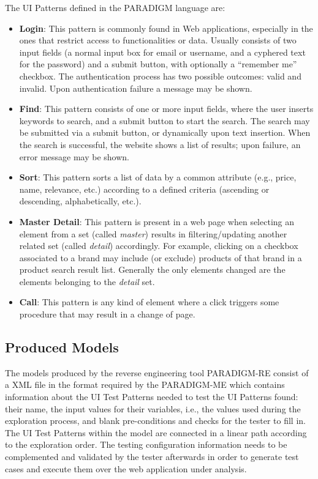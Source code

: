 The UI Patterns defined in the PARADIGM language are:
\begin{itemize}
\item \textbf{Login}: This pattern is commonly found in Web applications, especially in the ones that restrict access to functionalities or data. Usually consists of two input fields (a normal input box for email or username, and a cyphered text for the password) and a submit button, with optionally a ``remember me'' checkbox. The authentication process has two possible outcomes: valid and invalid. Upon authentication failure a message may be shown. 
\item \textbf{Find}: This pattern consists of one or more input fields, where the user inserts keywords to search, and a submit button to start the search. The search may be submitted via a submit button, or dynamically upon text insertion. When the search is successful, the website shows a list of results; upon failure, an error message may be shown.
\item \textbf{Sort}: This pattern sorts a list of data by a common attribute (e.g., price, name, relevance, etc.) according to a defined criteria (ascending or descending, alphabetically, etc.).
\item \textbf{Master Detail}: This pattern is present in a web page when selecting an element from a set (called \textit{master}) results in filtering/updating another related set (called \textit{detail}) accordingly. For example, clicking on a checkbox associated to a brand may include (or exclude) products of that brand in a product search result list. Generally the only elements changed are the elements belonging to the \textit{detail} set.
\item \textbf{Call}: This pattern is any kind of element where a click triggers some procedure that may result in a change of page.
\end{itemize}

\subsection{Produced Models}

The models produced by the reverse engineering tool PARADIGM-RE consist of a XML file in the format required by the PARADIGM-ME which contains information about the UI Test Patterns needed to test the UI Patterns found: their name, the input values for their variables, i.e., the values used during the exploration process, and blank pre-conditions and checks for the tester to fill in. The UI Test Patterns within the model are connected in a linear path according to the exploration order. The testing configuration information needs to be complemented and validated by the tester afterwards in order to generate test cases and execute them over the web application under analysis.

